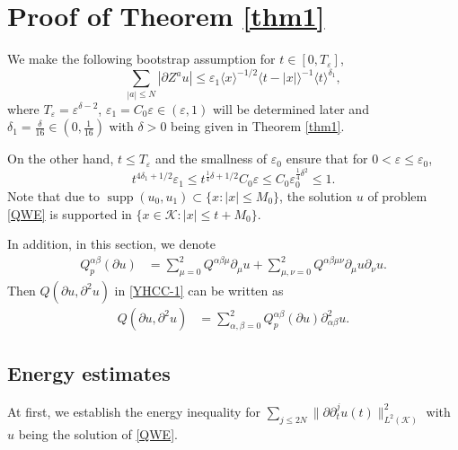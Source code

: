 \documentclass[11pt,twoside]{article}
\def\cK{\mathcal K}
\def\ds{\displaystyle}
\def\supp{\mathop{\rm supp}\nolimits}
\def\p{\partial}
\def\ve{\varepsilon}
\def\supp{\operatorname{supp}}
\newcommand{\w}[1]{\langle {#1} \rangle}
\theoremstyle{plain}
\theoremstyle{definition}
\numberwithin{equation}{section}
\begin{document}
\section{Proof of Theorem \ref{thm1}}\label{sect4}


We make the following bootstrap assumption for $t\in[0,T_\ve]$,
\begin{equation}\label{thm1-BA}
\sum_{|a|\le N}|\p Z^au|\le\ve_1\w{x}^{-1/2}\w{t-|x|}^{-1}\w{t}^{\delta_1},
\end{equation}
where $T_\ve=\ve^{\delta-2}$, $\ve_1=C_0\ve\in(\ve,1)$ will be determined later and $\delta_1=\frac{\delta}{16}\in(0,\frac{1}{16})$
with $\delta>0$ being given in Theorem \ref{thm1}.

On the other hand, $t\le T_\ve$ and the smallness of $\ve_0$ ensure that for $0<\ve\le\ve_0$,
\begin{equation}\label{thm1-time:BA}
t^{4\delta_1+1/2}\ve_1\le t^{\frac14\delta+1/2}C_0\ve\le C_0\ve_0^{\frac14\delta^2}\le1.
\end{equation}
Note that due to $\supp(u_0,u_1)\subset\{x: |x|\le M_0\}$,
the solution $u$ of problem \eqref{QWE} is supported in $\{x\in\cK:|x|\le t+M_0\}$.

In addition, in this section, we denote
\begin{equation}\label{YHCC-1-Y}
\begin{split}
Q_p^{\alpha\beta}(\p u)&=\sum_{\mu=0}^2Q^{\alpha\beta\mu}\p_{\mu}u
+\sum_{\mu,\nu=0}^2Q^{\alpha\beta\mu\nu}\p_{\mu}u\p_{\nu}u.
\end{split}
\end{equation}
Then $Q(\p u,\p^2u)$ in \eqref{YHCC-1} can be written as
\begin{equation}\label{YHCC-1-S}
\begin{split}
Q(\p u,\p^2u)&=\sum_{\alpha,\beta=0}^2Q_p^{\alpha\beta}(\p u)\p^2_{\alpha\beta}u.
\end{split}
\end{equation}

\subsection{Energy estimates}\label{Sonn-1}

At first, we establish the energy inequality for $\ds\sum_{j\le2N}\|\p\p_t^ju(t)\|^2_{L^2(\cK)}$
with $u$ being the solution of \eqref{QWE}.
\end{document}
